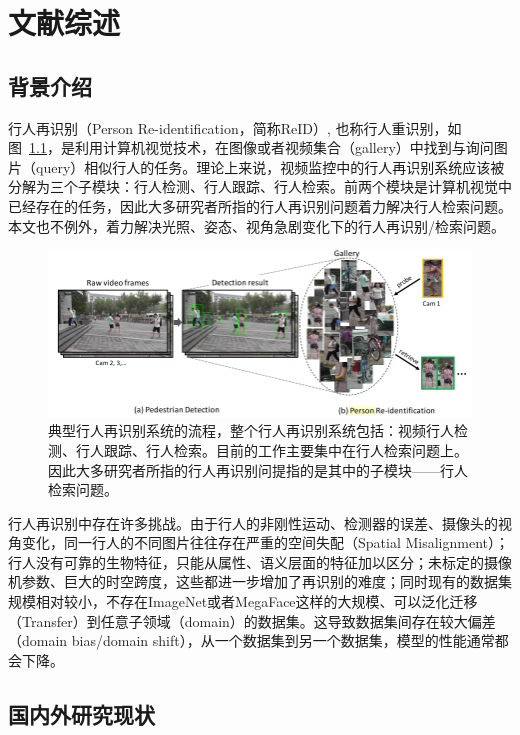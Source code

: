 \chapter{文献综述}

\section{背景介绍}

\indent 行人再识别（Person Re-identification，简称ReID）, 也称行人重识别\cite{zheng2016person}，如图~\ref{figure:background}，是利用计算机视觉技术，在图像或者视频集合（gallery）中找到与询问图片（query）相似行人的任务。理论上来说，视频监控中的行人再识别系统应该被分解为三个子模块：行人检测、行人跟踪、行人检索。前两个模块是计算机视觉中已经存在的任务，因此大多研究者所指的行人再识别问题着力解决行人检索问题\cite{zheng2017person}。本文也不例外，着力解决光照、姿态、视角急剧变化下的行人再识别/检索问题。

\begin{figure}
	\centering
	\captionsetup{width=.88\linewidth}
	\includegraphics[width=\linewidth,keepaspectratio]{data/kaitibaogao/background.png}
	\caption{\kaiti 典型行人再识别系统的流程，整个行人再识别系统包括：视频行人检测、行人跟踪、行人检索。目前的工作主要集中在行人检索问题上。因此大多研究者所指的行人再识别问提指的是其中的子模块——行人检索问题。}
	\label{figure:background}
\end{figure}

行人再识别中存在许多挑战。由于行人的非刚性运动、检测器的误差、摄像头的视角变化，同一行人的不同图片往往存在严重的空间失配（Spatial Misalignment）；行人没有可靠的生物特征，只能从属性、语义层面的特征加以区分；未标定的摄像机参数、巨大的时空跨度，这些都进一步增加了再识别的难度；同时现有的数据集规模相对较小，不存在ImageNet或者MegaFace这样的大规模、可以泛化迁移（Transfer）到任意子领域（domain）的数据集。这导致数据集间存在较大偏差（domain bias/domain shift），从一个数据集到另一个数据集，模型的性能通常都会下降。

\section{国内外研究现状}

